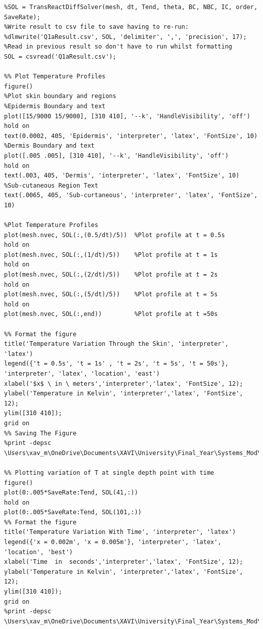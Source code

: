\documentclass[11pt]{article}
\begin{document}
\begin{appendices}
\begin{lstlisting}
%SOL = TransReactDiffSolver(mesh, dt, Tend, theta, BC, NBC, IC, order, SaveRate);
%Write result to csv file to save having to re-run:
%dlmwrite('Q1aResult.csv', SOL, 'delimiter', ',', 'precision', 17);
%Read in previous result so don't have to run whilst formatting
SOL = csvread('Q1aResult.csv');

%% Plot Temperature Profiles
figure()
%Plot skin boundary and regions
%Epidermis Boundary and text
plot([15/9000 15/9000], [310 410], '--k', 'HandleVisibility', 'off')
hold on
text(0.0002, 405, 'Epidermis', 'interpreter', 'latex', 'FontSize', 10)
%Dermis Boundary and text
plot([.005 .005], [310 410], '--k', 'HandleVisibility', 'off')
hold on
text(.003, 405, 'Dermis', 'interpreter', 'latex', 'FontSize', 10)
%Sub-cutaneous Region Text
text(.0065, 405, 'Sub-curtaneous', 'interpreter', 'latex', 'FontSize', 10)

%Plot Temperature Profiles
plot(mesh.nvec, SOL(:,(0.5/dt)/5))  %Plot profile at t = 0.5s
hold on
plot(mesh.nvec, SOL(:,(1/dt)/5))    %Plot profile at t = 1s
hold on
plot(mesh.nvec, SOL(:,(2/dt)/5))    %Plot profile at t = 2s
hold on
plot(mesh.nvec, SOL(:,(5/dt)/5))    %Plot profile at t = 5s
hold on
plot(mesh.nvec, SOL(:,end))         %Plot profile at t =50s

%% Format the figure
title('Temperature Variation Through the Skin', 'interpreter', 'latex')
legend({'t = 0.5s', 't = 1s' , 't = 2s', 't = 5s', 't = 50s'}, 'interpreter', 'latex', 'location', 'east')
xlabel('$x$ \ in \ meters','interpreter','latex', 'FontSize', 12);
ylabel('Temperature in Kelvin', 'interpreter','latex', 'FontSize', 12);
ylim([310 410]);
grid on
%% Saving The Figure
%print -depsc \Users\xav_m\OneDrive\Documents\XAVI\University\Final_Year\Systems_Mod\Modeling_CW2\Report\Figures\epsQ21TempXT

%% Plotting variation of T at single depth point with time
figure()
plot(0:.005*SaveRate:Tend, SOL(41,:))
hold on
plot(0:.005*SaveRate:Tend, SOL(101,:))
%% Format the figure
title('Temperature Variation With Time', 'interpreter', 'latex')
legend({'x = 0.002m', 'x = 0.005m'}, 'interpreter', 'latex', 'location', 'best')
xlabel('Time  in  seconds','interpreter','latex', 'FontSize', 12);
ylabel('Temperature in Kelvin', 'interpreter','latex', 'FontSize', 12);
ylim([310 410]);
grid on
%print -depsc \Users\xav_m\OneDrive\Documents\XAVI\University\Final_Year\Systems_Mod\Modeling_CW2\Report\Figures\epsTimePlot


\end{lstlisting}
\end{appendices}
\end{document}
